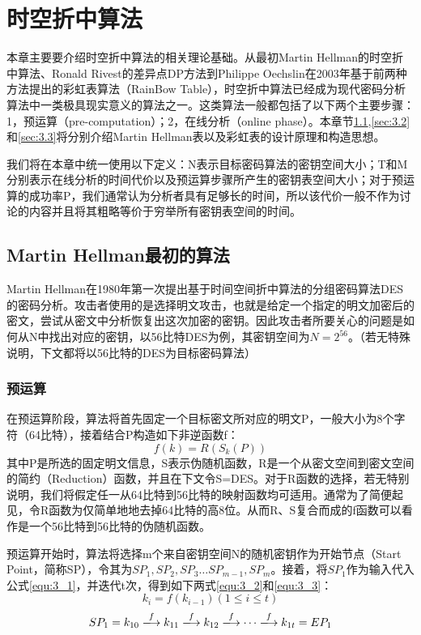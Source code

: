 \chapter{时空折中算法}
本章主要要介绍时空折中算法的相关理论基础。从最初Martin Hellman的时空折中算法、Ronald Rivest的差异点DP方法到Philippe Oechslin在2003年基于前两种方法提出的彩虹表算法（RainBow Table），时空折中算法已经成为现代密码分析算法中一类极具现实意义的算法之一。这类算法一般都包括了以下两个主要步骤：1，预运算（pre-computation）；2，在线分析（online phase）。本章节\ref{sec:3.1},\ref{sec:3.2}和\ref{sec:3.3}将分别介绍Martin Hellman表以及彩虹表的设计原理和构造思想。

我们将在本章中统一使用以下定义：N表示目标密码算法的密钥空间大小；T和M分别表示在线分析的时间代价以及预运算步骤所产生的密钥表空间大小；对于预运算的成功率P，我们通常认为分析者具有足够长的时间，所以该代价一般不作为讨论的内容并且将其粗略等价于穷举所有密钥表空间的时间。
\section{Martin Hellman最初的算法}
\label{sec:3.1}
Martin Hellman在1980年第一次提出基于时间空间折中算法的分组密码算法DES的密码分析\cite{hellman}。攻击者使用的是选择明文攻击，也就是给定一个指定的明文加密后的密文，尝试从密文中分析恢复出这次加密的密钥。因此攻击者所要关心的问题是如何从N中找出对应的密钥，以56比特DES为例，其密钥空间为$N=2^{56}$。（若无特殊说明，下文都将以56比特的DES为目标密码算法）
	\subsection{预运算}
在预运算阶段，算法将首先固定一个目标密文所对应的明文P，一般大小为8个字符（64比特），接着结合P构造如下非逆函数f：
\begin{equation}f(k)=R(S_k(P))
\label{equ:3_1}
\end{equation}
其中P是所选的固定明文信息，S表示伪随机函数，R是一个从密文空间到密文空间的简约（Reduction）函数，并且在下文令S=DES。对于R函数的选择，若无特别说明，我们将假定任一从64比特到56比特的映射函数均可适用。通常为了简便起见，令R函数为仅简单地地去掉64比特的高8位。从而R、S复合而成的f函数可以看作是一个56比特到56比特的伪随机函数。

预运算开始时，算法将选择m个来自密钥空间N的随机密钥作为开始节点（Start Point，简称SP），令其为$SP_1,SP_2,SP_3\ldots SP_{m-1},SP_m$。接着，将$SP_1$作为输入代入公式\eqref{equ:3_1}，并迭代t次，得到如下两式\eqref{equ:3_2}和\eqref{equ:3_3}：
\begin{equation}k_i=f(k_{i-1})  (1\leq i \leq t)
\label{equ:3_2}
\end{equation}
\begin{equation}SP_1=k_{10}\xlongrightarrow{f} k_{11}\xlongrightarrow{f} k_{12}\xlongrightarrow{f}\cdots \xlongrightarrow{f} k_{1t}=EP_1
\label{equ:3_3}
\end{equation}

